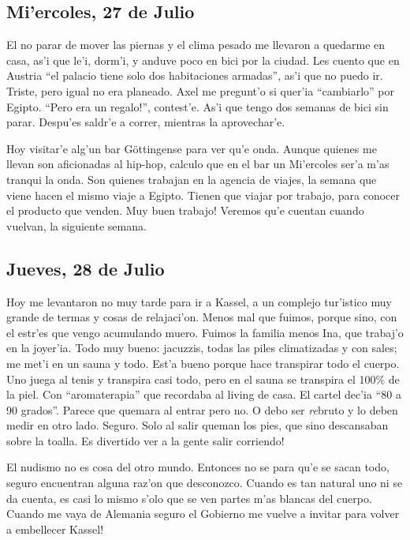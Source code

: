 \subsection*{Mi'ercoles, 27 de Julio}

El no parar de mover las piernas y el clima pesado me llevaron a quedarme en
casa, as'i que le'i, dorm'i, y anduve poco en bici por la ciudad. Les cuento que
en Austria ``el palacio tiene solo dos habitaciones armadas'', as'i que no puedo
ir. Triste, pero igual no era planeado. Axel me pregunt'o si quer'ia
``cambiarlo'' por Egipto. ``\textexclamdown Pero era un regalo!'', contest'e.
As'i que tengo dos semanas de bici sin parar. Despu'es saldr'e a correr,
mientras la aprovechar'e.

Hoy visitar'e alg'un bar G\"ottingense para ver qu'e onda. Aunque quienes me
llevan son aficionadas al hip-hop, calculo que en el bar un Mi'ercoles ser'a
m'as tranqui la onda. Son quienes trabajan en la agencia de viajes, la semana
que viene hacen el mismo viaje a Egipto. Tienen que viajar por trabajo, para
conocer el producto que venden. \textexclamdown Muy buen trabajo! Veremos
qu'e cuentan cuando vuelvan, la siguiente semana.

\subsection*{Jueves, 28 de Julio}

Hoy me levantaron no muy tarde para ir a Kassel, a un complejo tur'istico muy
grande de termas y cosas de relajaci'on. Menos mal que fuimos, porque sino, con
el estr'es que vengo acumulando muero. Fuimos la familia menos Ina, que trabaj'o
en la joyer'ia. Todo muy bueno: jacuzzis, todas las piles climatizadas y con
sales; me met'i en un sauna y todo. Est'a bueno porque hace transpirar todo el
cuerpo. Uno juega al tenis y transpira casi todo, pero en el sauna se transpira
el 100\% de la piel. Con ``aromaterapia'' que recordaba al living de casa. El
cartel dec'ia ``80 a 90 grados''. Parece que quemara al entrar pero no. O debo
ser \emph{re}bruto y lo deben medir en otro lado. Seguro. Solo al salir queman
los pies, que sino descansaban sobre la toalla. \textexclamdown Es divertido ver
a la gente salir corriendo!

El nudismo no es cosa del otro mundo. Entonces no se para qu'e se sacan todo,
seguro encuentran alguna raz'on que desconozco. Cuando es tan natural uno
ni se da cuenta, es casi lo mismo s'olo que se ven partes m'as blancas del
cuerpo. \textexclamdown Cuando me vaya de Alemania seguro el Gobierno me vuelve
a invitar para volver a embellecer Kassel!

